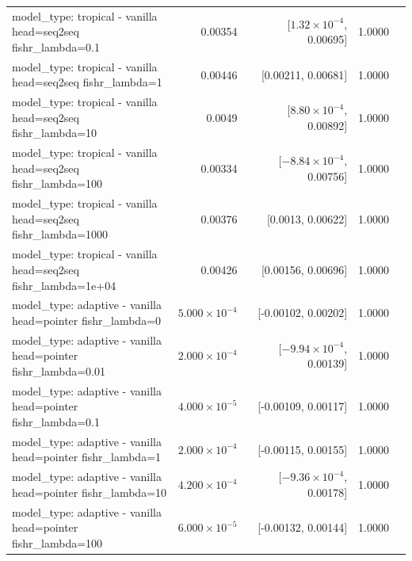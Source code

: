 \documentclass[10pt]{article}
\makeatletter
\newcommand{\stackcell}[1]{\begin{tabular}[t]{@{}l@{}}#1\end{tabular}}
\makeatother
\begin{document}
{\begin{longtable}{lrrrl}
\stackcell{model\_type: tropical - vanilla\\\footnotesize head=seq2seq fishr\_lambda=0.1 } & 0.00354 & [$1.32\times10^{-4}$, 0.00695] & 1.0000 & \\
\stackcell{model\_type: tropical - vanilla\\\footnotesize head=seq2seq fishr\_lambda=1 } & 0.00446 & [0.00211, 0.00681] & 1.0000 & \\
\stackcell{model\_type: tropical - vanilla\\\footnotesize head=seq2seq fishr\_lambda=10 } & 0.0049 & [$8.80\times10^{-4}$, 0.00892] & 1.0000 & \\
\stackcell{model\_type: tropical - vanilla\\\footnotesize head=seq2seq fishr\_lambda=100 } & 0.00334 & [$-8.84\times10^{-4}$, 0.00756] & 1.0000 & \\
\stackcell{model\_type: tropical - vanilla\\\footnotesize head=seq2seq fishr\_lambda=1000 } & 0.00376 & [0.0013, 0.00622] & 1.0000 & \\
\stackcell{model\_type: tropical - vanilla\\\footnotesize head=seq2seq fishr\_lambda=1e+04 } & 0.00426 & [0.00156, 0.00696] & 1.0000 & \\
\stackcell{model\_type: adaptive - vanilla\\\footnotesize head=pointer fishr\_lambda=0 } & $5.000\times10^{-4}$ & [-0.00102, 0.00202] & 1.0000 & \\
\stackcell{model\_type: adaptive - vanilla\\\footnotesize head=pointer fishr\_lambda=0.01 } & $2.000\times10^{-4}$ & [$-9.94\times10^{-4}$, 0.00139] & 1.0000 & \\
\stackcell{model\_type: adaptive - vanilla\\\footnotesize head=pointer fishr\_lambda=0.1 } & $4.000\times10^{-5}$ & [-0.00109, 0.00117] & 1.0000 & \\
\stackcell{model\_type: adaptive - vanilla\\\footnotesize head=pointer fishr\_lambda=1 } & $2.000\times10^{-4}$ & [-0.00115, 0.00155] & 1.0000 & \\
\stackcell{model\_type: adaptive - vanilla\\\footnotesize head=pointer fishr\_lambda=10 } & $4.200\times10^{-4}$ & [$-9.36\times10^{-4}$, 0.00178] & 1.0000 & \\
\stackcell{model\_type: adaptive - vanilla\\\footnotesize head=pointer fishr\_lambda=100 } & $6.000\times10^{-5}$ & [-0.00132, 0.00144] & 1.0000 & \\

\end{longtable}}
\end{document}

